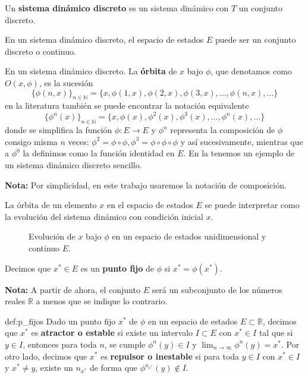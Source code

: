 \documentclass[../Main.tex]{subfiles}
\begin{document}
\begin{definition}{}{}
    Un \textbf{sistema dinámico discreto} es un sistema dinámico con $T$ un conjunto discreto. 
\end{definition}
\begin{remark}{}{}
En un sistema dinámico discreto, el espacio de estados $E$ puede ser un conjunto discreto o continuo.
\end{remark}
\begin{definition}{}{}
    En un sistema dinámico discreto. La \textbf{órbita} de $x$ bajo $\phi$, que denotamos como $O(x,\phi)$, es la sucesión \[\{\phi(n,x)\}_{n\in\mathbb{N}}=\{x,\phi(1,x),\phi(2,x),\phi(3,x),\dots,\phi(n,x),\dots\}\]
en la literatura también se puede encontrar la notación equivalente
    \[\{\phi^n(x)\}_{n\in\mathbb{N}}=\{x,\phi(x),\phi^2(x),\phi^3(x),\dots,\phi^n(x),\dots\}\]
    donde se simplifica la función $\phi : E\rightarrow E$ y $\phi^n$ representa la composición de $\phi$ consigo misma $n$ veces: $\phi^2=\phi\circ \phi, \phi^3=\phi\circ \phi\circ \phi$ y así sucesivamente, mientras que a $\phi^0$ la definimos como la función identidad en $E$. En la  tenemos un ejemplo de un sistema dinámico discreto sencillo. 
    
    \textbf{Nota:} Por simplicidad, en este trabajo usaremos la notación de composición.
\end{definition}


La órbita de un elemento $x$ en el espacio de estados $E$ se puede interpretar como la evolución del sistema dinámico con condición inicial $x$.

\begin{figure}[h!]
    \centering
    \caption{Evolución de $x$ bajo $\phi$ en un espacio de estados unidimensional y continuo $E$.}
    \label{Sdd}
\end{figure}


\begin{definition}{}{}
    Decimos que $x^*\in E$ es un \textbf{punto fijo} de $\phi$ si $x^*=\phi(x^*)$.
\end{definition}
\textbf{Nota:} A partir de ahora, el conjunto $E$ será un subconjunto de los números reales $\mathbb{R}$ a menos que se indique lo contrario.
\begin{definition}{}{def:p_fijos}
    Dado un punto fijo $x^*$ de $\phi$ en un espacio de estados $E\subset\mathbb{R}$, decimos que $x^*$ es \textbf{atractor o estable} si existe un intervalo $I\subset E$ con $x^*\in I$ tal que si $y\in I$, entonces para toda $n$, se cumple $\phi^n(y)\in I$ y $\lim_{n\rightarrow\infty}\phi^n(y)=x^*$. Por otro lado, decimos que $x^*$ es \textbf{repulsor o inestable} si para toda $y\in I$ con $x^*\in I$ y $x^*\neq y$, existe un $n_{x^*}$ de forma que $\phi^{n_{x^*}}(y)\notin I$.
\end{definition}
\end{document}
